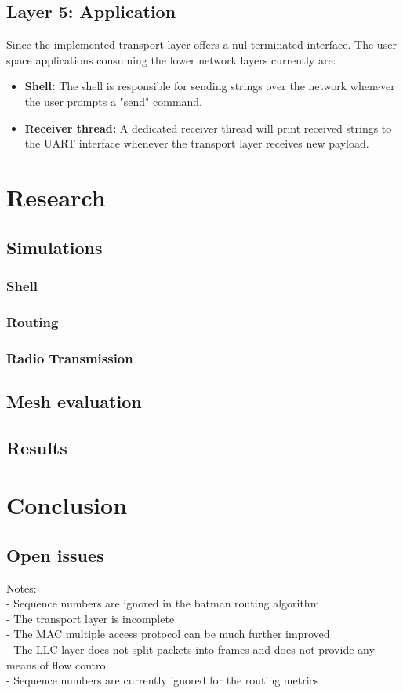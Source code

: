 \section{Layer 5: Application}%

Since the implemented transport layer offers a nul terminated interface. The user space applications consuming the lower network layers currently are:

\begin{itemize}
    \item \textbf{Shell:} The shell is responsible for sending strings over the network whenever the user prompts a "send" command.
    \item \textbf{Receiver thread:} A dedicated receiver thread will print received strings to the UART interface whenever the transport layer receives new payload.
\end{itemize}

\chapter{Research}%
\section{Simulations}%
\subsection{Shell}%
\subsection{Routing}%
\subsection{Radio Transmission}%
\section{Mesh evaluation}%
\section{Results}%

\chapter{Conclusion}%
\section{Open issues}%
Notes:\\
- Sequence numbers are ignored in the batman routing algorithm \\
- The transport layer is incomplete \\
- The MAC multiple access protocol can be much further improved\\
- The LLC layer does not split packets into frames and does not provide any means of flow control\\
- Sequence numbers are currently ignored for the routing metrics

